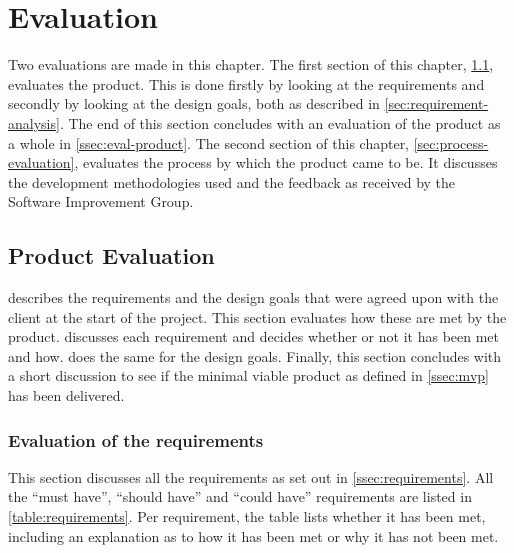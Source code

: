 \chapter{Evaluation}
\label{cha:evaluation}

Two evaluations are made in this chapter. The first section of this chapter,
\cref{sec:product-evaluation}, evaluates the product. This is done firstly by
looking at the requirements and secondly by looking at the design goals, both as
described in \cref{sec:requirement-analysis}. The end of this section concludes
with an evaluation of the product as a whole in \cref{ssec:eval-product}. The
second section of this chapter, \cref{sec:process-evaluation}, evaluates the
process by which the product came to be. It discusses the development
methodologies used and the feedback as received by the Software Improvement
Group.

\section{Product Evaluation}
\label{sec:product-evaluation}

 describes the requirements and the design goals
that were agreed upon with the client at the start of the project. This section
evaluates how these are met by the product. 
discusses each requirement and decides whether or not it has been met and how.
 does the same for the design goals.  Finally, this
section concludes with a short discussion to see if the minimal viable product
as defined in \cref{ssec:mvp} has been delivered.

\subsection{Evaluation of the requirements}
\label{ssec:eval-requirements}

This section discusses all the requirements as set out in
\cref{ssec:requirements}. All the ``must have'', ``should have'' and ``could
have'' requirements are listed in \cref{table:requirements}. Per requirement,
the table lists whether it has been met, including an explanation as to how it
has been met or why it has not been met.

